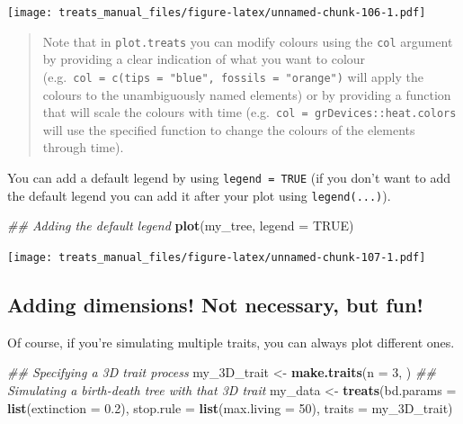 \documentclass[
]{book}
\newenvironment{Shaded}{\begin{snugshade}}{\end{snugshade}}
\newcommand{\CommentTok}[1]{\textcolor[rgb]{0.56,0.35,0.01}{\textit{#1}}}
\newcommand{\DataTypeTok}[1]{\textcolor[rgb]{0.13,0.29,0.53}{#1}}
\newcommand{\DecValTok}[1]{\textcolor[rgb]{0.00,0.00,0.81}{#1}}
\newcommand{\FloatTok}[1]{\textcolor[rgb]{0.00,0.00,0.81}{#1}}
\newcommand{\KeywordTok}[1]{\textcolor[rgb]{0.13,0.29,0.53}{\textbf{#1}}}
\newcommand{\NormalTok}[1]{#1}
\newcommand{\OtherTok}[1]{\textcolor[rgb]{0.56,0.35,0.01}{#1}}
\newcommand{\StringTok}[1]{\textcolor[rgb]{0.31,0.60,0.02}{#1}}
\begin{document}
\texttt{[image: treats\_manual\_files/figure-latex/unnamed-chunk-106-1.pdf]}

\begin{quote}
Note that in \texttt{plot.treats} you can modify colours using the \texttt{col} argument by providing a clear indication of what you want to colour (e.g.~\texttt{col\ =\ c(tips\ =\ "blue",\ fossils\ =\ "orange")} will apply the colours to the unambiguously named elements) or by providing a function that will scale the colours with time (e.g.~\texttt{col\ =\ grDevices::heat.colors} will use the specified function to change the colours of the elements through time).
\end{quote}

You can add a default legend by using \texttt{legend\ =\ TRUE} (if you don't want to add the default legend you can add it after your plot using \texttt{legend(...)}).

\begin{Shaded}
\begin{Highlighting}[]
\CommentTok{\#\# Adding the default legend}
\KeywordTok{plot}\NormalTok{(my\_tree, }\DataTypeTok{legend =} \OtherTok{TRUE}\NormalTok{)}
\end{Highlighting}
\end{Shaded}

\texttt{[image: treats\_manual\_files/figure-latex/unnamed-chunk-107-1.pdf]}

\hypertarget{adding-dimensions-not-necessary-but-fun}{%
\subsection{Adding dimensions! Not necessary, but fun!}\label{adding-dimensions-not-necessary-but-fun}}

Of course, if you're simulating multiple traits, you can always plot different ones.

\begin{Shaded}
\begin{Highlighting}[]
\CommentTok{\#\# Specifying a 3D trait process}
\NormalTok{my\_3D\_trait \textless{}{-}}\StringTok{ }\KeywordTok{make.traits}\NormalTok{(}\DataTypeTok{n =} \DecValTok{3}\NormalTok{, )}
\CommentTok{\#\# Simulating a birth{-}death tree with that 3D trait}
\NormalTok{my\_data \textless{}{-}}\StringTok{ }\KeywordTok{treats}\NormalTok{(}\DataTypeTok{bd.params =} \KeywordTok{list}\NormalTok{(}\DataTypeTok{extinction =} \FloatTok{0.2}\NormalTok{),}
                \DataTypeTok{stop.rule =} \KeywordTok{list}\NormalTok{(}\DataTypeTok{max.living =} \DecValTok{50}\NormalTok{),}
                \DataTypeTok{traits    =}\NormalTok{ my\_3D\_trait)}
\end{Highlighting}
\end{Shaded}
\end{document}
